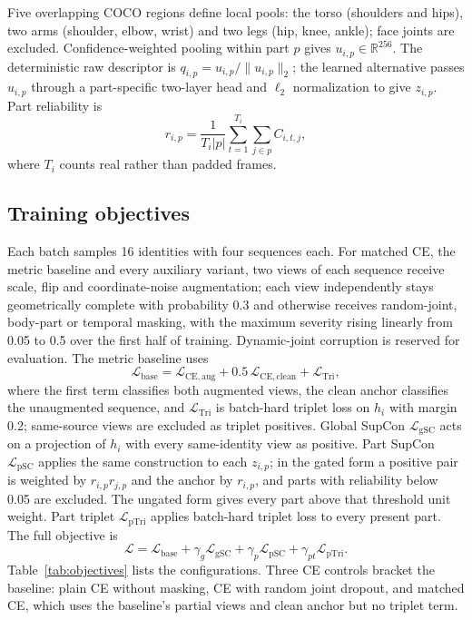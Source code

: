 \documentclass[journal]{IEEEtran}
\newcommand{\R}{\mathbb{R}}
\newcommand{\Lbase}{\mathcal{L}_{\mathrm{base}}}
\newcommand{\Lglobal}{\mathcal{L}_{\mathrm{gSC}}}
\newcommand{\Lpart}{\mathcal{L}_{\mathrm{pSC}}}
\newcommand{\Lptrip}{\mathcal{L}_{\mathrm{pTri}}}
\begin{document}
Five overlapping COCO regions define local pools: the torso (shoulders and
hips), two arms (shoulder, elbow, wrist) and two legs (hip, knee, ankle); face
joints are excluded. Confidence-weighted pooling within part $p$ gives
$u_{i,p}\in\R^{256}$. The deterministic raw descriptor is
$q_{i,p}=u_{i,p}/\lVert u_{i,p}\rVert_2$; the learned alternative passes
$u_{i,p}$ through a part-specific two-layer head and $\ell_2$ normalization to
give $z_{i,p}$. Part reliability is
\begin{equation}
 r_{i,p}=\frac{1}{T_i|p|}\sum_{t=1}^{T_i}\sum_{j\in p}C_{i,t,j},
 \label{eq:reliability}
\end{equation}
where $T_i$ counts real rather than padded frames.

\subsection{Training objectives}

Each batch samples 16 identities with four sequences each. For matched CE, the
metric baseline and every auxiliary variant, two views of each sequence receive
scale, flip and coordinate-noise augmentation; each view
independently stays geometrically complete with probability 0.3 and otherwise
receives random-joint, body-part or temporal masking, with the maximum
severity rising linearly from 0.05 to 0.5 over the first half of training.
Dynamic-joint corruption is reserved for evaluation. The metric baseline uses
\begin{equation}
 \Lbase = \mathcal{L}_{\mathrm{CE,aug}} + 0.5\,\mathcal{L}_{\mathrm{CE,clean}} + \mathcal{L}_{\mathrm{Tri}},
 \label{eq:base}
\end{equation}
where the first term classifies both augmented views, the clean anchor
classifies the unaugmented sequence, and $\mathcal{L}_{\mathrm{Tri}}$ is
batch-hard triplet loss \cite{hermans2017triplet} on $h_i$ with margin 0.2;
same-source views are excluded as triplet positives. Global SupCon $\Lglobal$
acts on a projection of $h_i$ with every same-identity view as positive. Part
SupCon $\Lpart$ applies the same construction to each $z_{i,p}$; in the gated
form a positive pair is weighted by $r_{i,p}r_{j,p}$ and the anchor by
$r_{i,p}$, and parts with reliability below 0.05 are excluded. The ungated form
gives every part above that threshold unit weight. Part triplet $\Lptrip$
applies batch-hard triplet loss to every present part. The full objective is
\begin{equation}
 \mathcal{L}=\Lbase+\gamma_g\Lglobal+\gamma_p\Lpart+\gamma_{pt}\Lptrip .
 \label{eq:objective}
\end{equation}
Table~\ref{tab:objectives} lists the configurations. Three CE controls bracket
the baseline: plain CE without masking, CE with random joint dropout, and
matched CE, which uses the baseline's partial views and clean anchor but no
triplet term.
\end{document}
